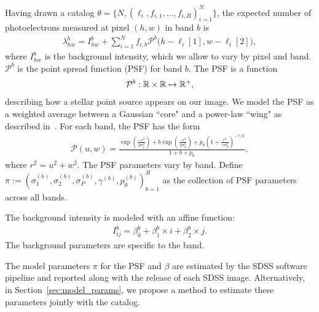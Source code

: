 Having drawn a catalog $\theta = \{N, (\ell_i, f_{i,1}, ..., f_{i,B})_{i = 1}^N\}$,
the expected number of photoelectrons measured at pixel $(h,w)$ in band $b$ is
\begin{align}
  \lambda^b_{hw} = I^{b}_{hw} + \sum_{i = 1}^N f_{i,b} \mathcal{P}^b\big(h - \ell_{i}[1], w - \ell_{i}[2]\big),
  \label{eq:expected_intensity}
\end{align}
where $I^{b}_{hw}$ is the background intensity, which we allow to vary by pixel and band. $\mathcal{P}^b$ is the point spread function (PSF) for band $b$. The PSF
is a function 
\begin{align}
\mathcal{P}^b : \mathbb{R} \times \mathbb{R} \mapsto \mathbb{R}^+,
\end{align}
describing how a stellar point source appears
on our image. We model the PSF as a weighted average between a Gaussian ``core" and a power-law ``wing" as described in~\cite{Xin2018psf}. For each band, the PSF has the form
\begin{align}
    \mathcal{P}(u,w) = \frac{\exp(\frac{-r^2}{2\sigma_1^2}) + 
                            b \exp(\frac{-r^2}{2\sigma_2^2}) + 
                            p_0(1 + \frac{r^2}{\gamma\sigma^2_P})^{-\gamma/2} }{1 + b + p_0},
\end{align}
where $r^2 = u^2 + w^2$. The PSF parameters vary by band. Define 
$\pi := (\sigma_{1}^{(b)}, \sigma_{2}^{(b)}, \sigma_{P}^{(b)}, \gamma^{(b)}, p_{0}^{(b)})_{b=1}^B$ as the collection of PSF parameters across all bands. 

The background intensity is modeled with an affine function: 
\begin{align}
    I_{ij}^{b} = \beta_0^{b} + \beta_1^{b} \times i + \beta_2^{b} \times j.
\end{align}
The background parameters are specific to the band. 

The model parameters $\pi$ for the PSF and $\beta$ are estimated by the SDSS software pipeline and reported along with the release of each SDSS image. Alternatively, in Section~\ref{sec:model_params}, we propose a method to estimate these parameters jointly with the catalog. 

